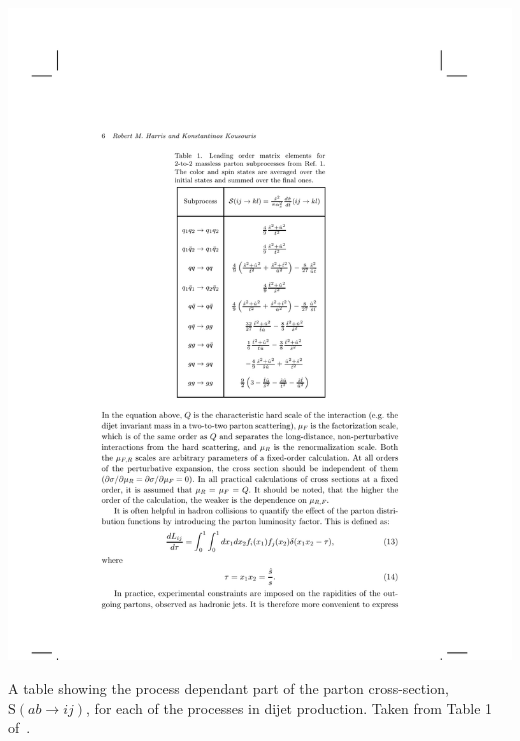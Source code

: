 %    
%

\begin{table}[!hbt]
  \begin{center}
    \includegraphics[width=0.7\linewidth, angle=0]{figs/Theory/qcd_dijet_stable.pdf}
  \end{center}
  \caption[A table showing the process dependant part of the parton cross-section, $\text{S}(ab \to ij)$, for each of the processes in dijet production.]
  {A table showing the process dependant part of the parton cross-section, $\text{S}(ab \to ij)$, for each of the processes in dijet production. Taken from Table 1 of~\cite{theo-dijet_harris}.}
  \label{tab:theo-qcd_dijet_s}
\end{table}

